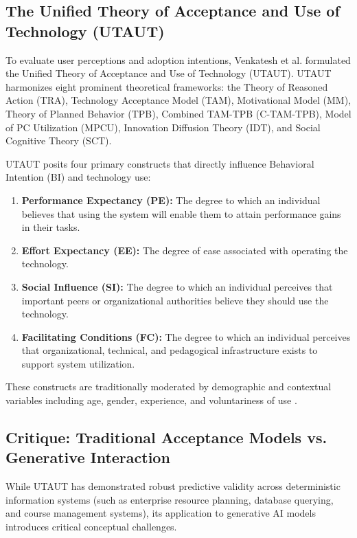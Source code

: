 \documentclass{cleiej}
\begin{document}
\subsection{The Unified Theory of Acceptance and Use of Technology (UTAUT)}
To evaluate user perceptions and adoption intentions, Venkatesh et al. \cite{venkatesh2003user} formulated the Unified Theory of Acceptance and Use of Technology (UTAUT). UTAUT harmonizes eight prominent theoretical frameworks: the Theory of Reasoned Action (TRA), Technology Acceptance Model (TAM), Motivational Model (MM), Theory of Planned Behavior (TPB), Combined TAM-TPB (C-TAM-TPB), Model of PC Utilization (MPCU), Innovation Diffusion Theory (IDT), and Social Cognitive Theory (SCT).

UTAUT posits four primary constructs that directly influence Behavioral Intention (BI) and technology use:
\begin{enumerate}[label=(\alph*)]
    \item \textbf{Performance Expectancy (PE):} The degree to which an individual believes that using the system will enable them to attain performance gains in their tasks.
    \item \textbf{Effort Expectancy (EE):} The degree of ease associated with operating the technology.
    \item \textbf{Social Influence (SI):} The degree to which an individual perceives that important peers or organizational authorities believe they should use the technology.
    \item \textbf{Facilitating Conditions (FC):} The degree to which an individual perceives that organizational, technical, and pedagogical infrastructure exists to support system utilization.
\end{enumerate}

These constructs are traditionally moderated by demographic and contextual variables including age, gender, experience, and voluntariness of use \cite{venkatesh2003user}.

\subsection{Critique: Traditional Acceptance Models vs. Generative Interaction}
While UTAUT has demonstrated robust predictive validity across deterministic information systems (such as enterprise resource planning, database querying, and course management systems), its application to generative AI models introduces critical conceptual challenges. 
\end{document}
